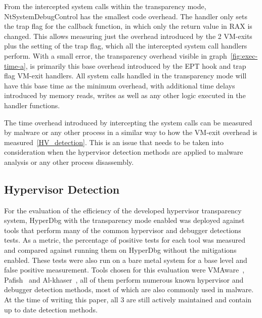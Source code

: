 From the intercepted system calls within the transparency mode, NtSystemDebugControl has the smallest code overhead. 
The handler only sets the trap flag for the callback function, in which only the return value in RAX is changed. 
This allows measuring just the overhead introduced by the 2 VM-exits plus the setting of the trap flag, which all the intercepted system call handlers perform. 
With a small error, the transparency overhead visible in graph~\ref{fig:exec-time-a}, is primarily this base overhead introduced by the EPT hook and trap flag VM-exit handlers. 
All system calls handled in the transparency mode will have this base time as the minimum overhead, with additional time delays introduced by memory reads, writes 
as well as any other logic executed in the handler functions.

The time overhead introduced by intercepting the system calls can be measured by malware or any other process in a similar way to how the VM-exit overhead is measured~\ref{HV_detection}. 
This is an issue that needs to be taken into consideration when the hypervisor detection methods are applied to malware analysis or any other process disassembly.

\subsection{Hypervisor Detection}
For the evaluation of the efficiency of the developed hypervisor transparency system, HyperDbg with the transparency mode enabled was deployed against tools that perform many of 
the common hypervisor and debugger detections tests. As a metric, the percentage of positive tests for each tool was measured and compared against running them on HyperDbg 
without the mitigations enabled. These tests were also run on a bare metal system for a base level and false positive measurement. 
Tools chosen for this evaluation were VMAware~\cite{vmaware}, Pafish~\cite{pafish} and Al-khaser~\cite{al-khaser}, all of them perform numerous known hypervisor and debugger detection methods, 
most of which are also commonly used in malware. At the time of writing this paper, all 3 are still actively maintained and contain up to date detection methods.

